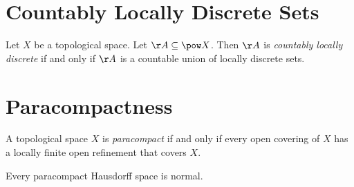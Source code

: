\section{Countably Locally Discrete Sets}

\begin{definition}
    Let $X$ be a topological space. Let $\AA \subseteq \pow X$. Then $\AA$ is \emph{countably locally discrete}
    if and only if $\AA$ is a countable union of locally discrete sets.
\end{definition}

\section{Paracompactness}

\begin{definition}
    A topological space $X$ is \emph{paracompact} if and only if every open covering of $X$ has a locally finite open
    refinement that covers $X$.
\end{definition}

\begin{proposition}
    Every paracompact Hausdorff space is normal.
\end{proposition}

